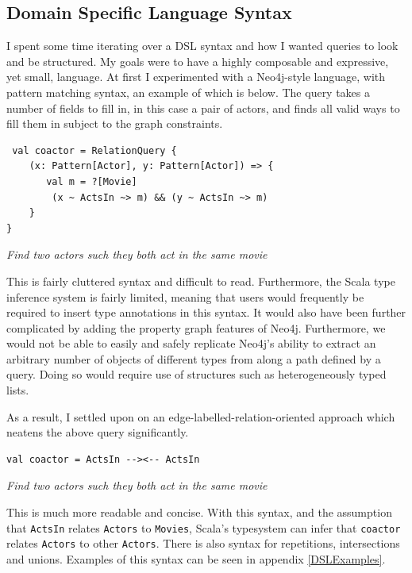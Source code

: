 \documentclass[12pt,a4paper,twoside,openright]{report}
\newcommand\codeName[1]{\texttt{#1}}
\newcommand\note[1]{\textit{#1}}
\renewcommand{\baselinestretch}{1.1}    %
\begin{document}
\subsection{Domain Specific Language Syntax}
I spent some time iterating over a DSL syntax and how I wanted queries to look and be structured. My goals were to have a highly composable and expressive, yet small, language. At first I experimented with a Neo4j-style language, with pattern matching syntax, an example of which is below. The query takes a number of fields to fill in, in this case a pair of actors, and finds all valid ways to fill them in subject to the graph constraints.
\renewcommand{\baselinestretch}{0.8}
\begin{framed}
\begin{verbatim}
 val coactor = RelationQuery {
    (x: Pattern[Actor], y: Pattern[Actor]) => {
       val m = ?[Movie]
        (x ~ ActsIn ~> m) && (y ~ ActsIn ~> m)
    }
}
\end{verbatim}
\note{Find two actors such they both act in the same movie}
\end{framed}
\renewcommand{\baselinestretch}{1.1}
This is fairly cluttered syntax and difficult to read. Furthermore, the Scala type inference system is fairly limited, meaning that users would frequently be required to insert type annotations in this syntax. It would also have been further complicated by adding the property graph features of Neo4j. Furthermore, we would not be able to easily and safely replicate Neo4j's ability to extract an arbitrary number of objects of different types from along a path defined by a query. Doing so would require use of structures such as heterogeneously typed lists.

As a result, I settled upon on an edge-labelled-relation-oriented approach which neatens the above query significantly.

\renewcommand{\baselinestretch}{0.8}
\begin{framed}
\begin{verbatim}
val coactor = ActsIn --><-- ActsIn
\end{verbatim}
\note{Find two actors such they both act in the same movie}
\end{framed}
\renewcommand{\baselinestretch}{1.1}

This is much more readable and concise. With this syntax, and the assumption that \codeName{ActsIn} relates \codeName{Actors} to \codeName{Movies}, Scala's typesystem can infer that \codeName{coactor} relates \codeName{Actors} to other \codeName{Actors}. There is also syntax for repetitions, intersections and unions. Examples of this syntax can be seen in appendix \ref{DSLExamples}.
\end{document}
